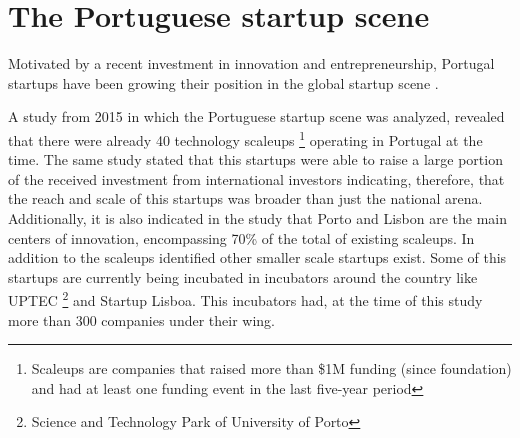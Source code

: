   	\section{The Portuguese startup scene} \label{sec:stateoftheart:sec:portuguesestartupscene}
    Motivated by a recent investment in innovation and entrepreneurship, Portugal startups have been growing their position in the global startup scene \cite{Coleman2015}.

    A study from 2015 \cite{StartupEuropePartnership2015} in which the Portuguese startup scene was analyzed, revealed that there were already 40 technology scaleups \footnote{Scaleups are companies that raised more than \$1M funding (since foundation) and had at least one funding event in the last five-year period } operating in Portugal at the time. The same study stated that this startups were able to raise a large portion of the received investment from international investors indicating, therefore, that the reach and scale of this startups was broader than just the national arena. Additionally, it is also indicated in the study that Porto and Lisbon are the main centers of innovation, encompassing 70\% of the total of existing scaleups. In addition to the scaleups identified other smaller scale startups exist. Some of this startups are currently being incubated in incubators around the country like UPTEC \footnote{Science and Technology Park of University of Porto} and Startup Lisboa. This incubators had, at the time of this study more than 300 companies \cite{Uptec,StartupLisboa} under their wing.


